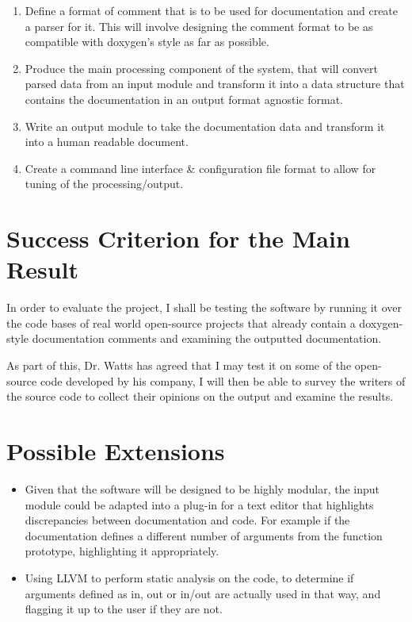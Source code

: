 \begin{enumerate}

\item Define a format of comment that is to be used for documentation
  and create a parser for it. This will involve designing the comment
  format to be as compatible with doxygen's style as far as possible.
\item Produce the main processing component of the system, that will
  convert parsed data from an input module and transform it into a
  data structure that contains the documentation in an output format
  agnostic format.
\item Write an output module to take the documentation data and
  transform it into a human readable document.
\item Create a command line interface \& configuration file format to
  allow for tuning of the processing/output.
\end{enumerate}

\section{Success Criterion for the Main Result}

In order to evaluate the project, I shall be testing the software by
running it over the code bases of real world open-source projects that
already contain a doxygen-style documentation comments and examining
the outputted documentation.

As part of this, Dr. Watts has agreed that I may test it on some of
the open-source code developed by his company, I will then be able to
survey the writers of the source code to collect their opinions on the
output and examine the results.

\section{Possible Extensions}

\begin{itemize}
\item Given that the software will be designed to be highly modular,
  the input module could be adapted into a plug-in for a text editor
  that highlights discrepancies between documentation and code. For
  example if the documentation defines a different number of arguments
  from the function prototype, highlighting it appropriately.
\item Using LLVM to perform static analysis on the code, to determine
  if arguments defined as in, out or in/out are actually used in that
  way, and flagging it up to the user if they are not.
\end{itemize}

